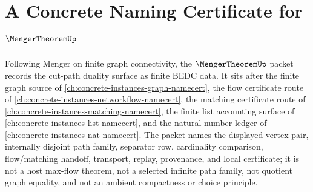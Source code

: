 \chapter{A Concrete Naming Certificate for $\MengerTheoremUp$}
\label{ch:concrete-instances-menger-theorem-namecert}

Following Menger on finite graph connectivity, the $\MengerTheoremUp$ packet records the cut-path duality surface as finite BEDC data. It sits after the finite graph source of \autoref{ch:concrete-instances-graph-namecert}, the flow certificate route of \autoref{ch:concrete-instances-networkflow-namecert}, the matching certificate route of \autoref{ch:concrete-instances-matching-namecert}, the finite list accounting surface of \autoref{ch:concrete-instances-list-namecert}, and the natural-number ledger of \autoref{ch:concrete-instances-nat-namecert}. The packet names the displayed vertex pair, internally disjoint path family, separator row, cardinality comparison, flow/matching handoff, transport, replay, provenance, and local certificate; it is not a host max-flow theorem, not a selected infinite path family, not quotient graph equality, and not an ambient compactness or choice principle.

